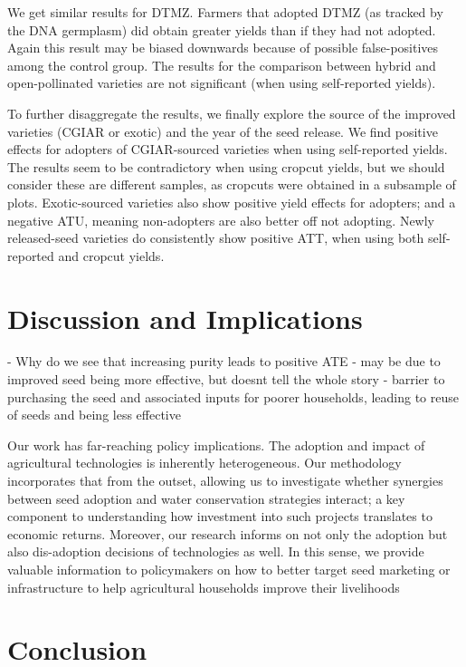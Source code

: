 \documentclass{article}
\begin{document}
We get similar results for DTMZ. Farmers that adopted DTMZ (as tracked by the DNA germplasm) did obtain greater yields than if they had not adopted. Again this result may be biased downwards because of possible false-positives among the control group. The results for the comparison between hybrid and open-pollinated varieties are not significant (when using self-reported yields).



To further disaggregate the results, we finally explore the source of the improved varieties (CGIAR or exotic) and the year of the seed release. We find positive effects for adopters of CGIAR-sourced varieties when using self-reported yields. The results seem to be contradictory when using cropcut yields, but we should consider these are different samples, as cropcuts were obtained in a subsample of plots. Exotic-sourced varieties also show positive yield effects for adopters; and a negative ATU, meaning non-adopters are also better off not adopting. Newly released-seed varieties do consistently show positive ATT, when using both self-reported and cropcut yields.




\section{Discussion and Implications}

- Why do we see that increasing purity leads to positive ATE
- may be due to improved seed being more effective, but doesnt tell the whole story
- barrier to purchasing the seed and associated inputs for poorer households, leading to reuse of seeds and being less effective


Our work has far-reaching policy implications. The adoption and impact of agricultural technologies is inherently heterogeneous. Our methodology incorporates that from the outset, allowing us to investigate whether synergies between seed adoption and water conservation strategies interact; a key component to understanding how investment into such projects translates to economic returns. Moreover, our research informs on not only the adoption but also dis-adoption decisions of technologies as well. In this sense, we provide valuable information to policymakers on how to better target seed marketing or infrastructure to help agricultural households improve their livelihoods


\section{Conclusion}



\end{document}
